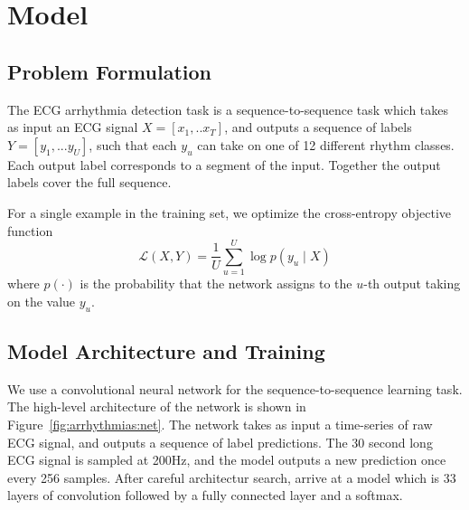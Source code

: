 \section{Model}
\label{sec:arrhythmias:model}

\subsection{Problem Formulation}

The ECG arrhythmia detection task is a sequence-to-sequence task which takes as
input an ECG signal $X=[x_1,.. x_T]$, and outputs a sequence of labels $Y=[y_1,
... y_U]$, such that each $y_u$ can take on one of 12 different rhythm
classes. Each output label corresponds to a segment of the input. Together the
output labels cover the full sequence.

For a single example in the training set, we optimize the cross-entropy
objective function
\[
 \mathcal{L}(X, Y) = \frac{1}{U} \sum_{u=1}^U \log p(y_u \mid X)
\]
where $p(\cdot)$ is the probability that the network assigns to the $u$-th
output taking on the value $y_u$.

\subsection{Model Architecture and Training}

We use a convolutional neural network for the sequence-to-sequence learning
task. The high-level architecture of the network is shown in
Figure~\ref{fig:arrhythmias:net}. The network takes as input a time-series of
raw ECG signal, and outputs a sequence of label predictions. The 30 second long
ECG signal is sampled at 200Hz, and the model outputs a new prediction once
every 256 samples. After careful architectur search, arrive at a model which is
33 layers of convolution followed by a fully connected layer and a softmax. 

